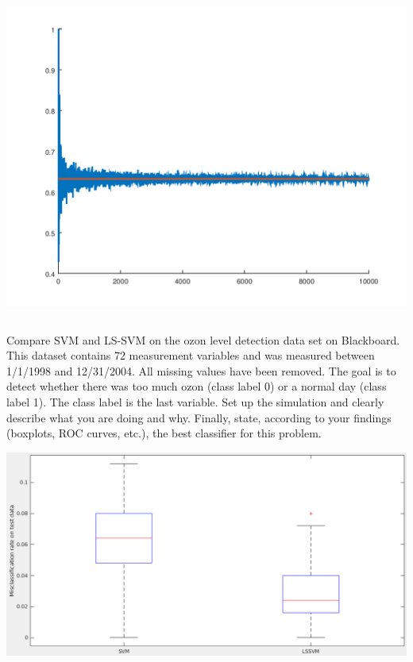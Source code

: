 \documentclass{jhwhw}
\begin{document}
    \begin{center}
	\includegraphics[scale=0.8]{p2.png}
    \end{center}
    \clearpage
    \inputminted[frame=lines,framesep=2mm]{matlab}{p2.m}

\problem{}

    Compare SVM and LS-SVM on the ozon level detection data set on Blackboard.
    This dataset contains 72 measurement variables and was measured between 1/1/1998 and 12/31/2004.
    All missing values have been removed. The goal is to detect whether there was too much ozon (class label 0)
    or a normal day (class label 1). The class label is the last variable. Set up the simulation and clearly describe what
    you are doing and why. Finally, state, according to your findings (boxplots, ROC curves, etc.), the best
    classifier for this problem.

\solution

    \begin{center}
	\includegraphics[scale=0.45]{p3_boxplot.png}
    \end{center}

    \inputminted[frame=lines,framesep=2mm]{matlab}{p3.m}
\end{document}
